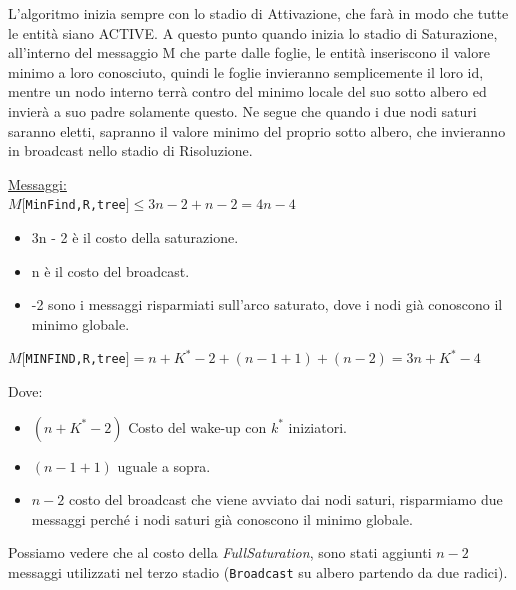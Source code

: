 L'algoritmo inizia sempre con lo stadio di Attivazione, che farà in modo che
tutte le entità siano ACTIVE. A questo punto quando inizia lo stadio di
Saturazione, all'interno del messaggio M che parte dalle foglie, le entità
inseriscono il valore minimo a loro conosciuto, quindi le foglie invieranno
semplicemente il loro id, mentre un nodo interno terrà contro del minimo locale
del suo sotto albero ed invierà a suo padre solamente questo. Ne segue che
quando i due nodi saturi saranno eletti, sapranno il valore minimo del proprio
sotto albero, che invieranno in broadcast nello stadio di Risoluzione.


\underline{Messaggi:}\\
$M[$\texttt{MinFind,R,tree}$] \leq 3n - 2 + n - 2 = 4n - 4$
\begin{itemize}
    \item 3n - 2 è il costo della saturazione.
    \item n è il costo del broadcast.
    \item -2 sono i messaggi risparmiati sull'arco saturato, dove i nodi già
          conoscono il minimo globale.
\end{itemize}

\begin{center}
    $M[$\texttt{MINFIND,R,tree}$] = n + K^* - 2 + (n-1+1) + (n-2) = 3n + K^* -
        4$\\
\end{center}
Dove:
\begin{itemize}
    \item $(n + K^* - 2)$ Costo del wake-up con $k^*$ iniziatori.
    \item $(n-1+1)$ uguale a sopra.
    \item $n-2$ costo del broadcast che viene avviato dai nodi saturi, risparmiamo
          due messaggi perché i nodi saturi già conoscono il minimo globale.
\end{itemize}
Possiamo vedere che al costo della \textit{FullSaturation}, sono stati aggiunti
$n-2$ messaggi utilizzati nel terzo stadio (\texttt{Broadcast} su albero
partendo da due radici).


